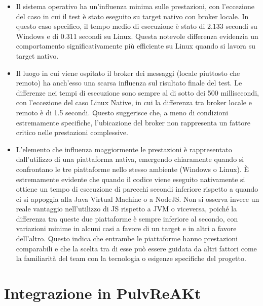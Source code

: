 \documentclass[12pt,a4paper,openright,twoside]{book}
\begin{document}
\begin{itemize}
    \item Il sistema operativo ha un’influenza minima sulle prestazioni, con l’eccezione del caso in cui il test è stato eseguito su target nativo con broker locale. 
    In questo caso specifico, il tempo medio di esecuzione è stato di 2.133 secondi su Windows e di 0.311 secondi su Linux. Questa notevole differenza evidenzia 
    un comportamento significativamente più efficiente su Linux quando si lavora su target nativo.

    \item Il luogo in cui viene ospitato il broker dei messaggi (locale piuttosto che remoto) ha anch’esso una scarsa influenza sul risultato finale del test. 
    Le differenze nei tempi di esecuzione sono sempre al di sotto dei 500 millisecondi, con l’eccezione del caso Linux Native, in cui la differenza tra broker locale e remoto 
    è di 1.5 secondi. Questo suggerisce che, a meno di condizioni estremamente specifiche, l'ubicazione del broker non rappresenta un fattore critico nelle prestazioni complessive.

    \item L’elemento che influenza maggiormente le prestazioni è rappresentato dall’utilizzo di una piattaforma nativa, emergendo chiaramente quando si confrontano 
    le tre piattaforme nello stesso ambiente (Windows o Linux). È estremamente evidente che quando il codice viene eseguito nativamente si ottiene un tempo 
    di esecuzione di parecchi secondi inferiore rispetto a quando ci si appoggia alla Java Virtual Machine o a NodeJS. Non si osserva invece un reale vantaggio nell’utilizzo 
    di \ac{JS} rispetto a \ac{JVM} o viceversa, poiché la differenza tra queste due piattaforme è sempre inferiore al secondo, con variazioni minime in alcuni casi a favore 
    di un target e in altri a favore dell'altro. Questo indica che entrambe le piattaforme hanno prestazioni comparabili e che la scelta tra di esse può essere guidata da 
    altri fattori come la familiarità del team con la tecnologia o esigenze specifiche del progetto.
\end{itemize}

\section{Integrazione in PulvReAKt}  %
\end{document}
